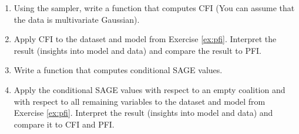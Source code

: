{\begin{enumerate}
\begin{enumerate}
\begin{equation}
        \end{equation}
        \item Then write a function, that takes the conditional mean and covariate structure and allows to sample from the respective (multivariate) Gaussian.
    \end{enumerate}
    \item Using the sampler, write a function that computes CFI (You can assume that the data is multivariate Gaussian).
    \item Apply CFI to the dataset and model from Exercise \ref{ex:pfi}. Interpret the result (insights into model and data) and compare the result to PFI.
    \item Write a function that computes conditional SAGE values.
    \item Apply the conditional SAGE values with respect to an empty coalition and with respect to all remaining variables to the dataset and model from Exercise \ref{ex:pfi}. Interpret the result (insights into model and data) and compare it to CFI and PFI.
\end{enumerate}
}
